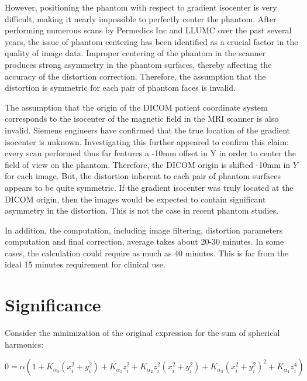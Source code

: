 However, positioning the phantom with respect to gradient isocenter is very difficult,
making it nearly impossible to perfectly center the phantom. After performing numerous
scans by Permedics Inc and LLUMC over the past several years, the issue of phantom centering has been identified
as a crucial factor in the quality of image data.  Improper centering of the phantom
in the scanner produces strong asymmetry in the phantom surfaces, thereby affecting the
accuracy of the distortion correction.  Therefore, the assumption that the distortion
is symmetric for each pair of phantom faces is invalid.

The assumption that the origin of the DICOM patient coordinate system corresponds to the isocenter of the magnetic field in the MRI scanner is also invalid. Siemens
engineers have confirmed that the true location of the gradient isocenter is unknown.
Investigating this further appeared to confirm this claim:  every scan performed thus far features a -10mm offset in Y in order to center the field of view on the phantom.  Therefore, the DICOM origin is shifted -10mm in $Y$ for each image.  But, the distortion inherent to each pair of phantom surfaces appears to be quite symmetric.  If the gradient isocenter was truly located at the DICOM origin, then the images would be expected to contain significant asymmetry in the distortion.  This is not the case in recent phantom studies.

In addition, the computation, including image filtering, distortion parameters
computation and final correction, average takes about 20-30 minutes.  In some cases, the calculation
could require as much as 40 minutes. This is far from the ideal 15 minutes requirement for clinical use.

\section{Significance}


Consider the minimization of the original expression for the sum of spherical harmonics:

\begin{equation} \label{eq:spherical_harmonics_2}
0 = \alpha(1 + K_{\alpha_0}(x^2_i + y^2_i) + K_{\alpha_1}z^2_i +
K_{\alpha_2}z^2_i(x^2_i + y^2_i) + K_{\alpha_3}(x^2_i + y^2_i)^2 +
K_{\alpha_4}z^4_i)
\end{equation}

